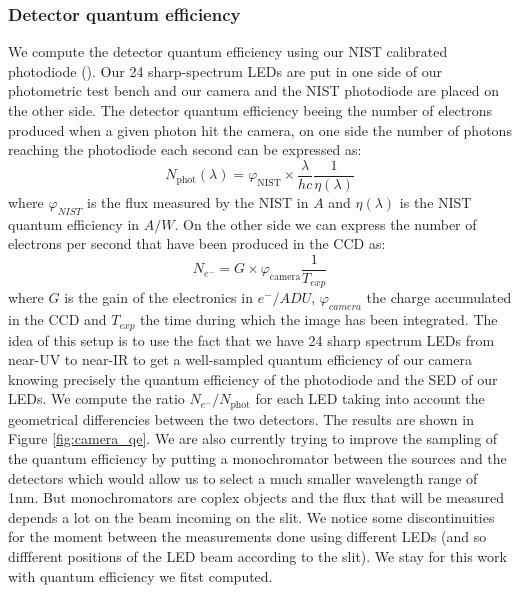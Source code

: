 \documentclass[\docopts]{\docclass}
\begin{document}
\subsubsection{Detector quantum efficiency }
\label{sec:qe}
We compute the detector quantum efficiency using our NIST calibrated
photodiode (). Our 24
sharp-spectrum LEDs are put in one side of our photometric test bench
and our camera and the NIST photodiode are placed on the other
side. The detector quantum efficiency beeing the number of electrons
produced when a given photon hit the camera, on one side the number of
photons reaching the photodiode each second can be expressed as:
\[
  N_\text{phot}(\lambda)= \varphi_\text{NIST} \times \frac{\lambda}{hc}
  \frac{1}{\eta(\lambda)}
\]
where $\varphi_{NIST}$ is the flux measured by the NIST in $A$ and
$\eta(\lambda)$ is the NIST quantum efficiency in $A/W$. On the other
side we can express the number of electrons per second that have been
produced in the CCD as:
\[
  N_{e^-} = G \times \varphi_\text{camera} \frac{1}{T_{exp}}
\]
where $G$ is the gain of the electronics in $e^-/ADU$,
$\varphi_{camera}$ the charge accumulated in the CCD and $T_{exp}$ the
time during which the image has been integrated. The idea of this
setup is to use the fact that we have 24 sharp spectrum LEDs from
near-UV to near-IR to get a well-sampled quantum efficiency of our
camera knowing precisely the quantum efficiency of the photodiode and
the SED of our LEDs. We compute the ratio $N_{e^-}/N_\text{phot}$ for
each LED taking into account the geometrical differencies between the
two detectors. The results are shown in Figure \ref{fig:camera_qe}. We
are also currently trying to improve the sampling of the quantum
efficiency by putting a monochromator between the sources and the
detectors which would allow us to select a much smaller wavelength
range of 1nm. But monochromators are coplex objects and the flux that
will be measured depends a lot on the beam incoming on the slit. We
notice some discontinuities for the moment between the measurements
done using different LEDs (and so diffferent positions of the LED beam
according to the slit). We stay for this work with quantum efficiency
we fitst computed.
\end{document}
